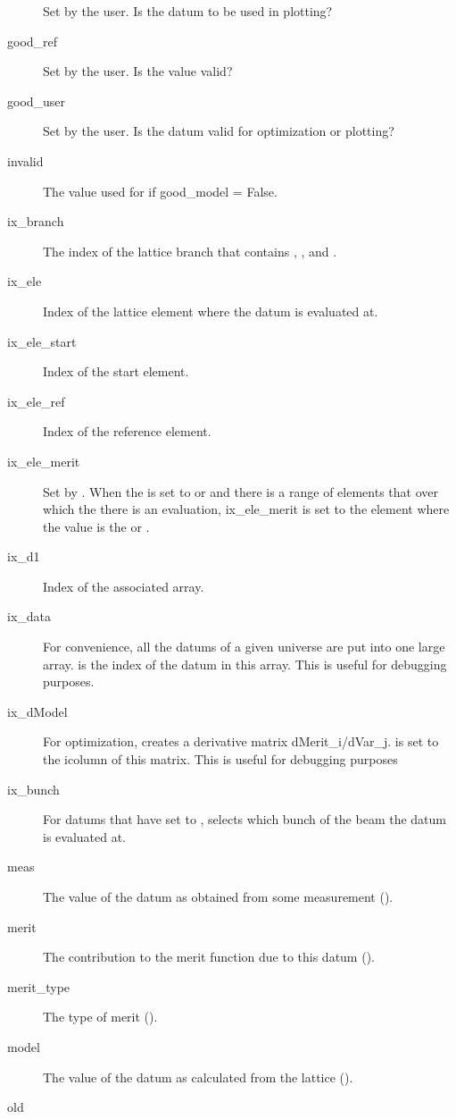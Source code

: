 \begin{description}
Set by the user. Is the datum to be used in plotting?
  \item[good_ref] \Newline
Set by the user. Is the  value valid?
  \item[good_user] \Newline
Set by the user. Is the datum valid for optimization or plotting?
  \item[invalid] \Newline
The value used for  if good_model = False. 
  \item[ix_branch] \Newline
The index of the lattice branch that contains , , and .
  \item[ix_ele] \Newline
Index of the lattice element where the datum is evaluated at. 
  \item[ix_ele_start] \Newline
Index of the start element.
  \item[ix_ele_ref] \Newline
Index of the reference element.
  \item[ix_ele_merit] \Newline
Set by \tao. When the  is set to  or  and there is a range
of elements that over which the there is an evaluation, ix_ele_merit is set to the element
where the value is the  or .
  \item[ix_d1] \Newline
Index of the associated  array.
  \item[ix_data] \Newline
For convenience, all the datums of a given universe are put into one large array.  is the index
of the datum in this array. This is useful for debugging purposes.
  \item[ix_dModel] \Newline
For optimization, \tao creates a derivative matrix dMerit_i/dVar_j.  is set
to the i\Th column of this matrix. This is useful for debugging purposes
  \item[ix_bunch] \Newline
For datums that have  set to ,  selects which bunch
of the beam the datum is evaluated at.
  \item[meas] \Newline
The value of the datum as obtained from some measurement ().
  \item[merit] \Newline
The contribution to the merit function due to this datum ().
  \item[merit_type] \Newline
The type of merit (). 
  \item[model] \Newline
The value of the datum as calculated from the  lattice ().
  \item[old] \Newline

\end{description}
